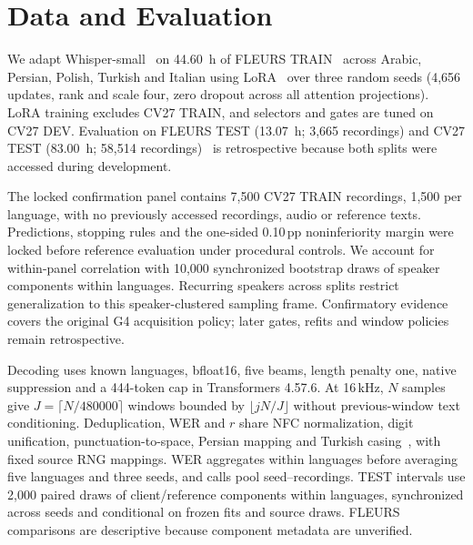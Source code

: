 \documentclass[conference,letterpaper]{IEEEtran}
\begin{document}
\section{Data and Evaluation}
We adapt Whisper-small~\cite{whisper} on 44.60~h of FLEURS TRAIN~\cite{fleurs} across Arabic, Persian, Polish, Turkish and Italian using LoRA~\cite{lora} over three random seeds (4,656 updates, rank and scale four, zero dropout across all attention projections). LoRA training excludes CV27 TRAIN, and selectors and gates are tuned on CV27 DEV. Evaluation on FLEURS TEST (13.07~h; 3,665 recordings) and CV27 TEST (83.00~h; 58,514 recordings)~\cite{cv2020} is retrospective because both splits were accessed during development.

The locked confirmation panel contains 7,500 CV27 TRAIN recordings, 1,500 per language, with no previously accessed recordings, audio or reference texts. Predictions, stopping rules and the one-sided 0.10\,pp noninferiority margin were locked before reference evaluation under procedural controls. We account for within-panel correlation with 10,000 synchronized bootstrap draws of speaker components within languages. Recurring speakers across splits restrict generalization to this speaker-clustered sampling frame. Confirmatory evidence covers the original G4 acquisition policy; later gates, refits and window policies remain retrospective.

Decoding uses known languages, bfloat16, five beams, length penalty one, native suppression and a 444-token cap in Transformers 4.57.6. At 16\,kHz, $N$ samples give $J=\lceil N/480000\rceil$ windows bounded by $\lfloor jN/J\rfloor$ without previous-window text conditioning. Deduplication, WER and $r$ share NFC normalization, digit unification, punctuation-to-space, Persian mapping and Turkish casing~\cite{normalization}, with fixed source RNG mappings. WER aggregates within languages before averaging five languages and three seeds, and calls pool seed--recordings. TEST intervals use 2,000 paired draws of client/reference components within languages, synchronized across seeds and conditional on frozen fits and source draws. FLEURS comparisons are descriptive because component metadata are unverified.
\end{document}
